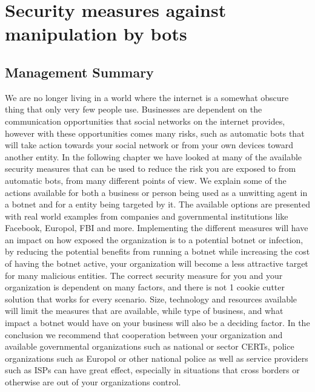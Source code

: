 \chapter{Security measures against manipulation by bots}

\section{Management Summary}
We are no longer living in a world where the internet is a somewhat obscure thing that only very few people use. Businesses are dependent on the communication opportunities that social networks on the internet provides, however with these opportunities comes many risks, such as automatic bots that will take action towards your social network or from your own devices toward another entity.
In the following chapter we have looked at many of the available security measures that can be used to reduce the risk you are exposed to from automatic bots, from many different points of view.
We explain some of the actions available for both a business or person being used as a unwitting agent in a botnet and for a entity being targeted by it.
The available options are presented with real world examples from companies and governmental institutions like Facebook, Europol, FBI and more.
Implementing the different measures will have an impact on how exposed the organization is to a potential botnet or infection, by reducing the potential benefits from running a botnet while increasing the cost of having the botnet active, your organization will become a less attractive target for many malicious entities.
The correct security measure for you and your organization is dependent on many factors, and there is not 1 cookie cutter solution that works for every scenario.
Size, technology and resources available will limit the measures that are available, while type of business, and what impact a botnet would have on your business will also be a deciding factor.
In the conclusion we recommend that cooperation between your organization and available governmental organizations such as national or sector CERTs, police organizations such as Europol or other national police as well as service providers such as ISPs can have great effect, especially in situations that cross borders or otherwise are out of your organizations control.
\newpage

